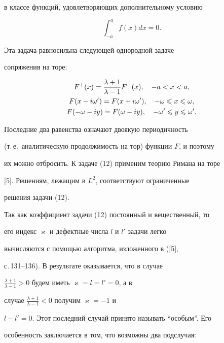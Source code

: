 в классе функций, удовлетворяющих дополнительному условию


\begin{equation}


\int^{a}_{-a}f(x)dx=0.


\end{equation}


Эта задача равносильна следующей однородной задаче


сопряжения на торе:


\begin{gather}


F^{+}(x)=\dfrac{\lambda+1}{\lambda-1}F^{-}(x),\quad


-a<x<a, \notag \\


%


F(x-i\omega')=F(x+i\omega'),\quad


-\omega\leqslant x\leqslant\omega, \\


%


F(-\omega-iy)=F(\omega-iy),\quad


-\omega'\leqslant y\leqslant \omega'.\notag


\end{gather}


Последние два равенства означают двоякую периодичность


(т.\,е.\ аналитическую продолжимость на тор) функции $F$, и поэтому


их можно отбросить. К задаче (12) применим теорию Римана на торе


[5]. Решениям, лежащим в $L^{2}$, соответствуют ограниченные


решения задачи (12).


Так как коэффициент задачи (12) постоянный и вещественный, то


его индекс $\varkappa$ и дефектные числа $l$ и $l'$ задачи легко


вычисляются с помощью алгоритма, изложенного в ([5],


с.\,131--136). В результате оказывается, что в случае


$\frac{\lambda+1}{\lambda-1}>0$ будем иметь $\varkappa=l=l'=0$, а в


случае $\frac{\lambda+1}{\lambda-1}<0$ получим $\varkappa=-1$ и


$l-l'=0$. Этот последний случай принято называть ``особым''. Его


особенность заключается в том, что возможны два подслучая:


